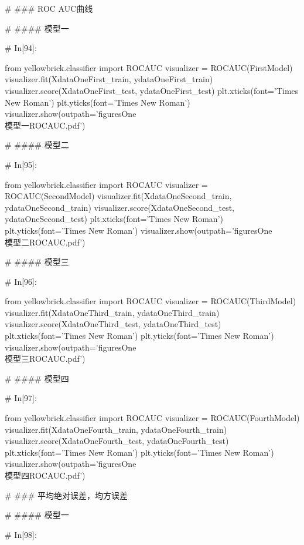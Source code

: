 \documentclass{MathorCupmodeling}
\begin{document}
\begin{python}
# ### ROC AUC曲线

# #### 模型一

# In[94]:


from yellowbrick.classifier import ROCAUC
visualizer = ROCAUC(FirstModel)
visualizer.fit(XdataOneFirst_train, ydataOneFirst_train)
visualizer.score(XdataOneFirst_test, ydataOneFirst_test)
plt.xticks(font='Times New Roman')
plt.yticks(font='Times New Roman')
visualizer.show(outpath='figuresOne\\[附件1]模型一ROCAUC.pdf')


# #### 模型二

# In[95]:


from yellowbrick.classifier import ROCAUC
visualizer = ROCAUC(SecondModel)
visualizer.fit(XdataOneSecond_train, ydataOneSecond_train)
visualizer.score(XdataOneSecond_test, ydataOneSecond_test)
plt.xticks(font='Times New Roman')
plt.yticks(font='Times New Roman')
visualizer.show(outpath='figuresOne\\[附件1]模型二ROCAUC.pdf')


# #### 模型三

# In[96]:


from yellowbrick.classifier import ROCAUC
visualizer = ROCAUC(ThirdModel)
visualizer.fit(XdataOneThird_train, ydataOneThird_train)
visualizer.score(XdataOneThird_test, ydataOneThird_test)
plt.xticks(font='Times New Roman')
plt.yticks(font='Times New Roman')
visualizer.show(outpath='figuresOne\\[附件1]模型三ROCAUC.pdf')


# #### 模型四

# In[97]:


from yellowbrick.classifier import ROCAUC
visualizer = ROCAUC(FourthModel)
visualizer.fit(XdataOneFourth_train, ydataOneFourth_train)
visualizer.score(XdataOneFourth_test, ydataOneFourth_test)
plt.xticks(font='Times New Roman')
plt.yticks(font='Times New Roman')
visualizer.show(outpath='figuresOne\\[附件1]模型四ROCAUC.pdf')


# ### 平均绝对误差，均方误差

# #### 模型一

# In[98]:



\end{python}
\end{document}
